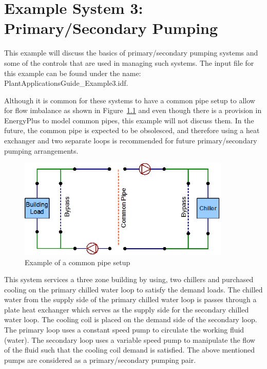 \chapter{Example System 3: Primary/Secondary Pumping}\label{example-system-3-primarysecondary-pumping}

This example will discuss the basics of primary/secondary pumping systems and some of the controls that are used in managing such systems. The input file for this example can be found under the name: PlantApplicationsGuide\_Example3.idf.

Although it is common for these systems to have a common pipe setup to allow for flow imbalance as shown in Figure~\ref{fig:example-of-a-common-pipe-setup} and even though there is a provision in EnergyPlus to model common pipes, this example will not discuss them. In the future, the common pipe is expected to be obsolesced, and therefore using a heat exchanger and two separate loops is recommended for future primary/secondary pumping arrangements.

\begin{figure}[hbtp] %
\centering
\includegraphics[width=0.9\textwidth, height=0.9\textheight, keepaspectratio=true]{media/image087.png}
\caption{Example of a common pipe setup \protect \label{fig:example-of-a-common-pipe-setup}}
\end{figure}

This system services a three zone building by using, two chillers and purchased cooling on the primary chilled water loop to satisfy the demand loads. The chilled water from the supply side of the primary chilled water loop is passes through a plate heat exchanger which serves as the supply side for the secondary chilled water loop. The cooling coil is placed on the demand side of the secondary loop. The primary loop uses a constant speed pump to circulate the working fluid (water). The secondary loop uses a variable speed pump to manipulate the flow of the fluid such that the cooling coil demand is satisfied. The above mentioned pumps are considered as a primary/secondary pumping pair.

